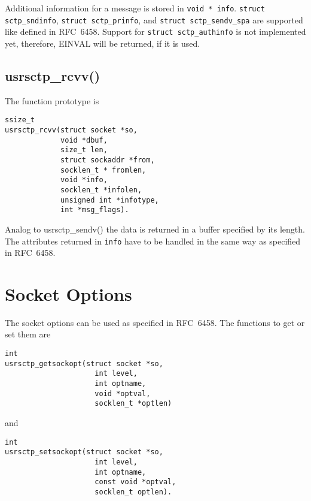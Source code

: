 \documentclass[a4paper]{article}
\begin{document}
Additional information for a message is stored in \texttt{void * info}. \texttt{struct sctp\_sndinfo},
\texttt{struct sctp\_prinfo}, and \texttt{struct sctp\_sendv\_spa} are supported like defined in 
RFC~6458. Support for \texttt{struct sctp\_authinfo} is not implemented yet, therefore, EINVAL
will be returned, if it is used.

\subsection{usrsctp\_rcvv()}
The function prototype is
\begin{verbatim}
ssize_t
usrsctp_rcvv(struct socket *so,
             void *dbuf,
             size_t len,
             struct sockaddr *from,
             socklen_t * fromlen,
             void *info,
             socklen_t *infolen,
             unsigned int *infotype,
             int *msg_flags).
\end{verbatim}
Analog to usrsctp\_sendv() the data is returned in a buffer specified by its length. The attributes
returned in \texttt{info} have to be handled in the same way as specified in RFC~6458.  

\section{Socket Options}
The socket options can be used as specified in RFC~6458. The functions to get or set them are

\begin{verbatim}
int
usrsctp_getsockopt(struct socket *so,
                     int level,
                     int optname,
                     void *optval,
                     socklen_t *optlen)
\end{verbatim}
and
\begin{verbatim}
int
usrsctp_setsockopt(struct socket *so,
                     int level,
                     int optname,
                     const void *optval,
                     socklen_t optlen).
\end{verbatim}
\end{document}
